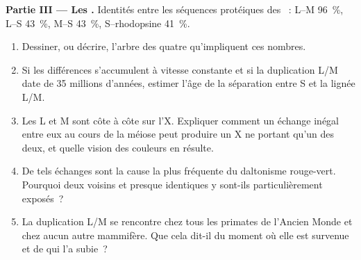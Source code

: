 \begin{problem}
\medskip
\noindent\textbf{Partie III --- Les .}
Identités entre les séquences protéiques des ~: L--M 96~\%,
L--S 43~\%, M--S 43~\%, S--rhodopsine 41~\%.
\begin{enumerate}[resume]
  \item Dessiner, ou décrire, l'arbre des quatre  qu'impliquent
        ces nombres.
  \item Si les différences s'accumulent à vitesse constante et si la
        duplication L/M date de 35 millions d'années, estimer l'âge de
        la séparation entre S et la lignée L/M.
  \item Les  L et M sont côte à côte sur l'X. Expliquer comment un
        échange inégal entre eux au cours de la méiose peut produire un
        X ne portant qu'un des deux, et quelle vision des couleurs en
        résulte.
  \item De tels échanges sont la cause la plus fréquente du daltonisme
        rouge-vert. Pourquoi deux  voisins et presque identiques
        y sont-ils particulièrement exposés~?
  \item La duplication L/M se rencontre chez tous les primates de
        l'Ancien Monde et chez aucun autre mammifère. Que cela dit-il
        du moment où elle est survenue et de qui l'a subie~?
\end{enumerate}


\end{problem}
